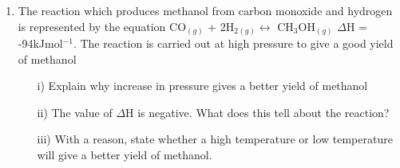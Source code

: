 \begin{enumerate}
	\item The reaction which produces methanol from carbon monoxide and hydrogen is represented by the equation CO$_{(g)}$ + 2H$_{2 (g)} \leftrightarrow$ CH$_3$OH$_{(g)}$ $\Delta$H = -94kJmol$^{-1}$. The reaction is carried out at high pressure to give a good yield of methanol
		\begin{enumerate}[topsep=0ex,itemsep=0ex,partopsep=1ex,parsep=1ex]
		\item[i)] Explain why increase in pressure gives a better yield of methanol
		\item[ii)] The value of $\Delta$H is negative. What does this tell about the reaction?
		\item[iii)] With a reason, state whether a high temperature or low temperature will give a better yield of methanol. 
	\end{enumerate}

\end{enumerate}









